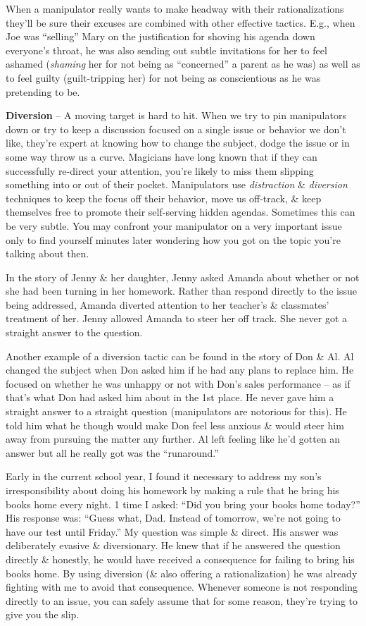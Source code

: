 \documentclass{article}
\numberwithin{equation}{section}
\begin{document}
When a manipulator really wants to make headway with their rationalizations they'll be sure their excuses are combined with other effective tactics. E.g., when Joe was ``selling'' Mary on the justification for shoving his agenda down everyone's throat, he was also sending out subtle invitations for her to feel ashamed (\textit{shaming} her for not being as ``concerned'' a parent as he was) as well as to feel guilty (guilt-tripping her) for not being as conscientious as he was pretending to be.

\textbf{Diversion} -- A moving target is hard to hit. When we try to pin manipulators down or try to keep a discussion focused on a single issue or behavior we don't like, they're expert at knowing how to change the subject, dodge the issue or in some way throw us a curve. Magicians have long known that if they can successfully re-direct your attention, you're likely to miss them slipping something into or out of their pocket. Manipulators use \textit{distraction} \& \textit{diversion} techniques to keep the focus off their behavior, move us off-track, \& keep themselves free to promote their self-serving hidden agendas. Sometimes this can be very subtle. You may confront your manipulator on a very important issue only to find yourself minutes later wondering how you got on the topic you're talking about then.

In the story of Jenny \& her daughter, Jenny asked Amanda about whether or not she had been turning in her homework. Rather than respond directly to the issue being addressed, Amanda diverted attention to her teacher's \& classmates' treatment of her. Jenny allowed Amanda to steer her off track. She never got a straight answer to the question.

Another example of a diversion tactic can be found in the story of Don \& Al. Al changed the subject when Don asked him if he had any plans to replace him. He focused on whether he was unhappy or not with Don's sales performance -- as if that's what Don had asked him about in the 1st place. He never gave him a straight answer to a straight question (manipulators are notorious for this). He told him what he though would make Don feel less anxious \& would steer him away from pursuing the matter any further. Al left feeling like he'd gotten an answer but all he really got was the ``runaround.''

Early in the current school year, I found it necessary to address my son's irresponsibility about doing his homework by making a rule that he bring his books home every night. 1 time I asked: ``Did you bring your books home today?'' His response was: ``Guess what, Dad. Instead of tomorrow, we're not going to have our test until Friday.'' My question was simple \& direct. His answer was deliberately evasive \& diversionary. He knew that if he answered the question directly \& honestly, he would have received a consequence for failing to bring his books home. By using diversion (\& also offering a rationalization) he was already fighting with me to avoid that consequence. Whenever someone is not responding directly to an issue, you can safely assume that for some reason, they're trying to give you the slip.
\end{document}
